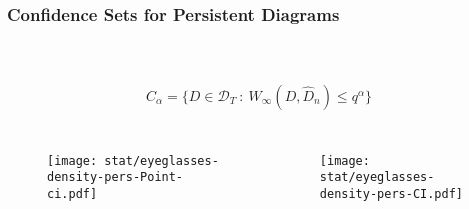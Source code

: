 \begin{frame}
 \frametitle{Confidence Sets for Persistent Diagrams}
 \framesubtitle{~}
 \begin{block}{}
  $$C_{\alpha}
  = \{ D \in \mathcal{D}_T ~:~ W_{\infty}(D,\widehat{D}_n) \leq q^{\alpha} \}$$
 \end{block}

 \begin{columns}
     \begin{figure}
     \centering

 \texttt{[image: stat/eyeglasses-density-pers-Point-ci.pdf]}
     \end{figure}
   \pause
     \begin{figure}
     \centering

\texttt{[image: stat/eyeglasses-density-pers-CI.pdf]}
     \end{figure}
\end{columns}
\end{frame}



